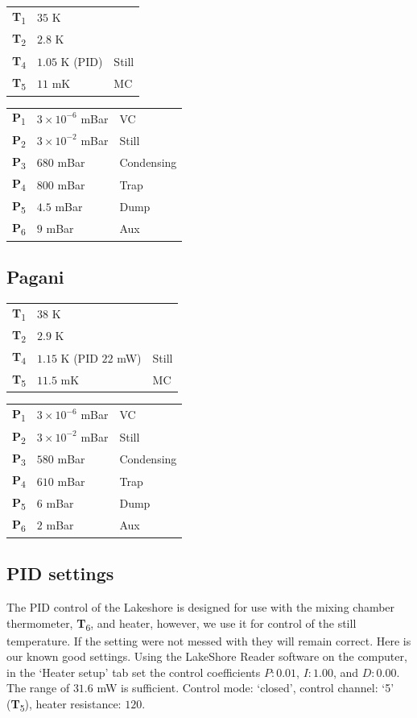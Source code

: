 \documentclass{article}[18pt,A4]
\newcommand{\pressure}[1]{{\color{pressurecolor}\textbf{P}\textsubscript{#1}}}
\newcommand{\temperature}[1]{{\color{temperaturecolor}\textbf{T}\textsubscript{#1}}}
\begin{document}
\begin{tabular}{lll}
\temperature{1} & $35$ K & \\
\temperature{2} & $2.8$ K & \\
\temperature{4} & $1.05$ K (PID) & Still\\
\temperature{5} & $11$ mK & MC
\end{tabular}
\hfill
\begin{tabular}{lll}
\pressure{1} & $3\times 10^{-6}$ mBar  & VC         \\
\pressure{2} & $3\times 10^{-2}$ mBar  & Still      \\
\pressure{3} & $680$ mBar  & Condensing \\
\pressure{4} & $800$ mBar  & Trap       \\
\pressure{5} & $4.5$ mBar  & Dump       \\
\pressure{6} & $9$ mBar  & Aux       
\end{tabular}

\subsection{Pagani}

\begin{tabular}{lll}
\temperature{1} & $38$ K & \\
\temperature{2} & $2.9$ K & \\
\temperature{4} & $1.15$ K (PID  $22$ mW) & Still\\
\temperature{5} & $11.5$ mK & MC
\end{tabular}
\hfill
\begin{tabular}{lll}
\pressure{1} & $3\times 10^{-6}$ mBar  & VC         \\
\pressure{2} & $3\times 10^{-2}$ mBar  & Still      \\
\pressure{3} & $580$ mBar  & Condensing \\
\pressure{4} & $610$ mBar  & Trap       \\
\pressure{5} & $6$ mBar  & Dump       \\
\pressure{6} & $2$ mBar  & Aux       
\end{tabular}

\subsection{PID settings}
The PID control of the Lakeshore is designed for use with the mixing chamber thermometer, \temperature{6}, and heater,
however, we use it for control of the still temperature. 
If the setting were not messed with they will remain correct. Here is our known good settings.
Using the LakeShore Reader software on the computer, in the `Heater setup' tab set the control coefficients
$P: 0.01$, $I:1.00$, and $D:0.00$. The range of $31.6$ mW is sufficient. Control mode: `closed', control channel: `5' (\temperature{5}), heater resistance: $120$.
\end{document}
